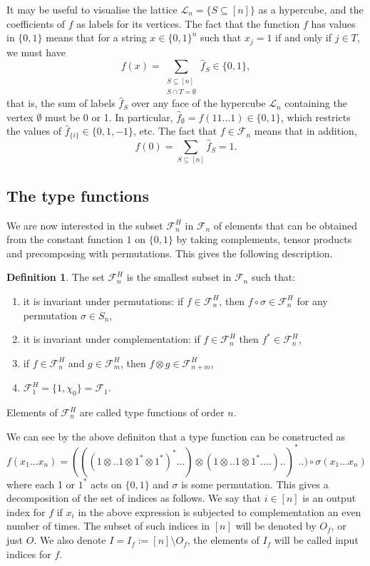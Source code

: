 \documentclass[12pt]{article}
\theoremstyle{definition}
\newtheorem{defi}{Definition}
\theoremstyle{remark}
\def\Fe{\mathcal F}
\begin{document}
It may be useful to visualise the lattice $\mathcal L_n=\{S\subseteq [n]\}$ as a
hypercube, and the coefficients of $f$ as labels for its vertices. The fact that the
function $f$ has values in $\{0,1\}$ means that for a string $x\in \{0,1\}^n$ such that
$x_j=1$ if and only if $j\in T$, we must have 
\[
f(x)=\sum_{\substack{S\subseteq [n]\\ S\cap T=\emptyset}} \hat f_S\in \{0,1\},
\]
that is, the sum of labels $\hat f_S$ over any face of the hypercube $\mathcal L_n$ containing the vertex $\emptyset$ must
be 0 or 1. In particular, $\hat f_\emptyset=f(11\dots 1)\in \{0,1\}$, which restricts the
values of $\hat f_{\{i\}}\in
\{0,1,-1\}$, etc. The fact that $f\in \Fe_n$ means that in addition,
\[
f(0)=\sum_{S\subseteq [n]}\hat f_S=1.
\]


\subsection{The type functions}

We are now interested in the subset  $\Fe_n^H$ in $\Fe_n$ of elements that can be 
obtained from the constant function $1$ on $\{0,1\}$ by taking complements, tensor
products and precomposing with permutations.
This gives the following description. 

\begin{defi}\label{defi:fhn} The set $\Fe_n^H$ is the smallest subset in $\Fe_n$ such
that:
\begin{enumerate}
\item it is invariant under permutations: if $f\in \Fe_n^H$, then $f\circ \sigma\in
\Fe_n^H$ for any permutation $\sigma\in S_n$,
\item it is invariant under complementation: if $f\in \Fe_n^H$ then $f^*\in \Fe_n^H$,
\item if $f\in \Fe_n^H$ and $g\in \Fe_m^H$, then $f\otimes g\in \Fe_{n+m}^H$,
\item $\Fe_1^H=\{1,\chi_0\}=\Fe_1$. 



\end{enumerate}
Elements of $\Fe_n^H$ are called type functions of order $n$.


\end{defi}


We can see by the above definiton that a type function can be constructed as 
\[
f(x_1\dots x_n)=(((1\otimes ..1\otimes 1^*\otimes 1^*)^*...)\otimes (1\otimes..1\otimes
1^*....)..)^*..)\circ
\sigma(x_1\dots x_n)
\]
where each 1 or $1^*$ acts on $\{0,1\}$ and  $\sigma$ is some permutation. This gives a
decomposition of the set of indices as follows. We say that $i\in [n]$ is an output index
for $f$ if $x_i$ in the above expression is subjected to complementation an even number of
times. The subset of such indices in $[n]$ will be denoted by $O_f$, or just $O$. We also
denote $I=I_f:=[n]\setminus O_f$, the elements of $I_f$ will be called input indices for
$f$.
\end{document}
